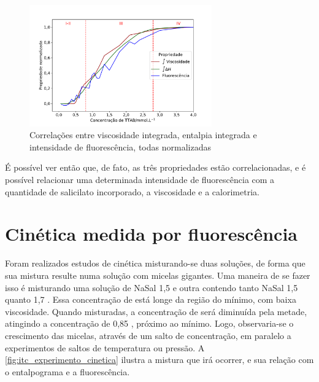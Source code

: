 	\begin{figure}[h]
		\centering
		\includegraphics[width=0.7\textwidth]{imagens/fluor/correlacoes_propriedades_zoom}
		\caption{Correlações entre viscosidade integrada, entalpia integrada e intensidade de fluorescência, todas normalizadas}
		\label{fig:correlacoes_propriedades_zoom}
	\end{figure}
	
	É possível ver então que, de fato, as três propriedades estão correlacionadas, e é possível relacionar uma determinada intensidade de fluorescência com a quantidade de salicilato incorporado, a viscosidade e a calorimetria.

	\FloatBarrier	
	
	\section{Cinética medida por fluorescência} 
	
	Foram realizados estudos de cinética misturando-se duas soluções, de forma que sua mistura resulte numa solução com micelas gigantes. Uma maneira de se fazer isso é misturando uma solução de NaSal 1,5 \mM{} e outra contendo tanto NaSal 1,5 \mM{} quanto \TTAB{} 1,7 \mM. Essa concentração de \TTAB{} está longe da região do mínimo, com baixa viscosidade. Quando misturadas, a concentração de \TTAB{} será diminuída pela metade, atingindo a concentração de 0,85 \mM{}, próximo ao mínimo. Logo, observaria-se o crescimento das micelas, através de um salto de concentração, em paralelo a experimentos de saltos de temperatura ou pressão.\cite{Hoffmann2012a} A \autoref{fig:itc_experimento_cinetica} ilustra a mistura que irá ocorrer, e sua relação com o entalpograma e a fluorescência.
	

